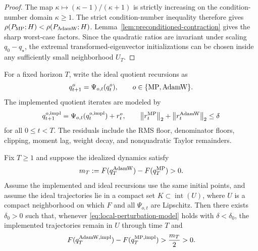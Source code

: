 \begin{proof}
The map $\kappa\mapsto(\kappa-1)/(\kappa+1)$ is strictly increasing on the
condition-number domain $\kappa\geq1$.
The strict condition-number inequality therefore gives
$\rho(P_{\operatorname{MP}};H)<\rho(P_{\operatorname{AdamW}};H)$.  Lemma~\ref{lem:preconditioned-contraction} gives the
sharp worst-case factors.  Since the quadratic ratios are invariant under scaling
$q_0-q_\star$, the extremal transformed-eigenvector initializations can be chosen inside
any sufficiently small neighborhood $U_T$.
\end{proof}

For a fixed horizon $T$, write the ideal quotient recursions as
\begin{equation}
    q_{t+1}^o=\Psi_{o,t}(q_t^o),
    \qquad o\in\{\operatorname{MP},\operatorname{AdamW}\}.
    \label{eq:ideal-quotient-recursion}
\end{equation}
The implemented quotient iterates are modeled by
\begin{equation}
    q_{t+1}^{o,{\rm impl}}=\Psi_{o,t}(q_t^{o,{\rm impl}})+r_t^o,
    \qquad
    \left\lVert r_t^{\operatorname{MP}} \right\rVert_2+\left\lVert r_t^{\operatorname{AdamW}} \right\rVert_2\leq\delta
    \label{eq:local-perturbation-model}
\end{equation}
for all $0\leq t<T$.  The residuals include the RMS floor, denominator floors, clipping,
moment lag, weight decay, and nonquadratic Taylor remainders.

\begin{proposition}
\label{prop:complete-perturbation}
Fix $T\geq1$ and suppose the idealized dynamics satisfy
\begin{equation}
    m_T:=F(q_T^{\operatorname{AdamW}})-F(q_T^{\operatorname{MP}})>0 .
    \label{eq:finite-gap}
\end{equation}
Assume the implemented and ideal recursions use the same initial points, and assume the
ideal trajectories lie in a compact set $K\subset\operatorname{int}(U)$, where $U$ is a
compact neighborhood on which $F$ and all $\Psi_{o,t}$ are Lipschitz.  Then
there exists $\delta_0>0$ such that, whenever \eqref{eq:local-perturbation-model}
holds with $\delta<\delta_0$, the implemented trajectories remain in $U$ through time
$T$ and
\begin{equation}
    F(q_T^{\operatorname{AdamW},{\rm impl}})-F(q_T^{\operatorname{MP},{\rm impl}})>\frac{m_T}{2}>0 .
    \label{eq:stable-gap}
\end{equation}
\end{proposition}

